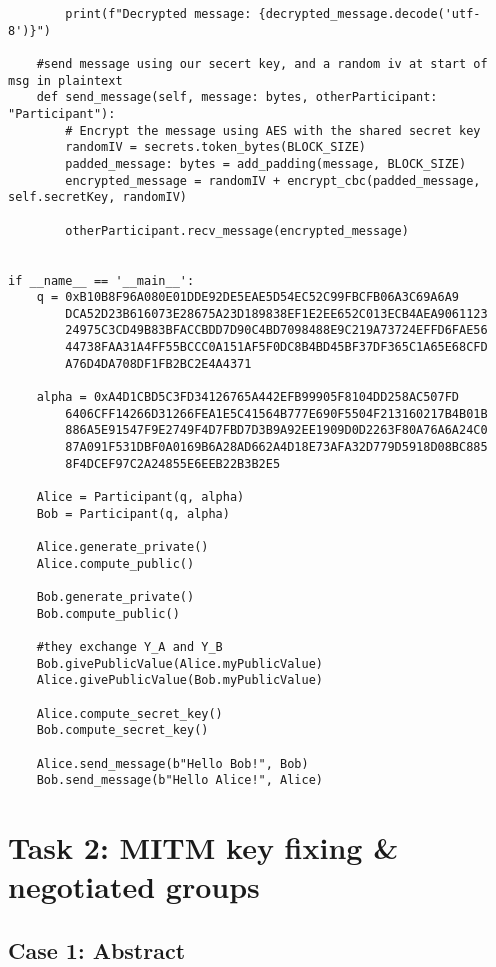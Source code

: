 \documentclass[11pt]{article}
\begin{document}
\begin{lstlisting}
        print(f"Decrypted message: {decrypted_message.decode('utf-8')}")

    #send message using our secert key, and a random iv at start of msg in plaintext
    def send_message(self, message: bytes, otherParticipant: "Participant"):
        # Encrypt the message using AES with the shared secret key
        randomIV = secrets.token_bytes(BLOCK_SIZE)
        padded_message: bytes = add_padding(message, BLOCK_SIZE)
        encrypted_message = randomIV + encrypt_cbc(padded_message, self.secretKey, randomIV)

        otherParticipant.recv_message(encrypted_message)


if __name__ == '__main__':
    q = 0xB10B8F96A080E01DDE92DE5EAE5D54EC52C99FBCFB06A3C69A6A9
		DCA52D23B616073E28675A23D189838EF1E2EE652C013ECB4AEA9061123
		24975C3CD49B83BFACCBDD7D90C4BD7098488E9C219A73724EFFD6FAE56
		44738FAA31A4FF55BCCC0A151AF5F0DC8B4BD45BF37DF365C1A65E68CFD
		A76D4DA708DF1FB2BC2E4A4371

    alpha = 0xA4D1CBD5C3FD34126765A442EFB99905F8104DD258AC507FD
		6406CFF14266D31266FEA1E5C41564B777E690F5504F213160217B4B01B
		886A5E91547F9E2749F4D7FBD7D3B9A92EE1909D0D2263F80A76A6A24C0
		87A091F531DBF0A0169B6A28AD662A4D18E73AFA32D779D5918D08BC885
		8F4DCEF97C2A24855E6EEB22B3B2E5

    Alice = Participant(q, alpha)
    Bob = Participant(q, alpha)

    Alice.generate_private()
    Alice.compute_public()

    Bob.generate_private()
    Bob.compute_public()

    #they exchange Y_A and Y_B
    Bob.givePublicValue(Alice.myPublicValue)
    Alice.givePublicValue(Bob.myPublicValue)

    Alice.compute_secret_key()
    Bob.compute_secret_key()

    Alice.send_message(b"Hello Bob!", Bob)
    Bob.send_message(b"Hello Alice!", Alice)
\end{lstlisting}


\section*{Task 2: MITM key fixing \& negotiated groups}

\subsection*{Case 1: Abstract}
\end{document}
